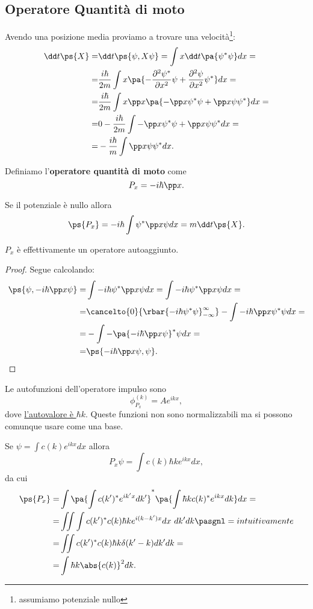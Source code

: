 \subsection{Operatore Quantit\`a di moto}
\noindent Avendo una posizione media proviamo a trovare una velocit\`a\footnote{assumiamo potenziale nullo}:
\begin{align*}
\dd t{}\ps{X}=&\dd t{}\ps{\psi,X\psi}=\int x\dd t{}\pa{\psi^\ast\psi}dx=\\
=&\frac{i\hbar}{2m}\int x\pa{-\pps[2] x{\psi^\ast}\psi+\pps[2] x{\psi}\psi^\ast}dx=\\
=&\frac{i\hbar}{2m}\int x\pp x{}\pa{-\pp x{\psi^\ast}\psi+\pp x{\psi}\psi^\ast}dx=\\
=&0-\frac{i\hbar}{2m}\int-\pp x{\psi^\ast}\psi+\pp x{\psi}\psi^\ast dx=\\
=&-\frac{i\hbar}{m}\int\pp x{\psi}\psi^\ast dx.
\end{align*}
\begin{definition}
Definiamo l'\textbf{operatore quantit\`a di moto} come
\[P_x=-i\hbar \pp x{}.\]
\end{definition}
\begin{remark}
Se il potenziale \`e nullo allora 
\[\ps{P_x}=-i\hbar\int \psi^\ast\pp x\psi dx=m\dd t{}\ps{X}.\]
\end{remark}
\begin{remark}
$P_x$ \`e effettivamente un operatore autoaggiunto.
\end{remark}
\begin{proof}
Segue calcolando:
\begin{align*}
\ps{\psi,-i\hbar\pp x\psi}=&\int-i\hbar\psi^\ast\pp x\psi dx=\int-i\hbar\psi^\ast\pp x\psi dx=\\
=&\cancelto{0}{\rbar{-i\hbar\psi^\ast\psi}^\infty_{-\infty}}-\int -i\hbar\pp x{\psi^\ast}\psi dx=\\
=&-\int -\pa{-i\hbar\pp x{\psi}}^\ast\psi dx=\\
=&\ps{-i\hbar\pp x\psi,\psi}.
\end{align*}
\end{proof}

\begin{remark}
Le autofunzioni dell'operatore impulso sono
\[\phi^{(k)}_{P_x}=Ae^{ikx},\]
dove \underline{l'autovalore \`e $\hbar k$}. 
Queste funzioni non sono normalizzabili ma si possono comunque usare come una base.
\end{remark}
\noindent Se $\psi=\int c(k)e^{ikx}dx$ allora
\[P_x\psi=\int c(k)\hbar k e^{ikx}dx,\]
da cui
\begin{align*}
\ps{P_x}=&\int\pa{\int c(k')^\ast e^{ik'x}dk'}^\ast\pa{\int \hbar kc(k)^\ast e^{ikx}dk}dx=\\
=&\iint \int c(k')^\ast c(k) \hbar k e^{i(k-k')x}dx\ dk'dk\pasgnl={intuitivamente}\\
=&\iint c(k')^\ast c(k) \hbar k\delta(k'-k)dk'dk=\\
=&\int \hbar k\abs{c(k)}^2dk.
\end{align*}

